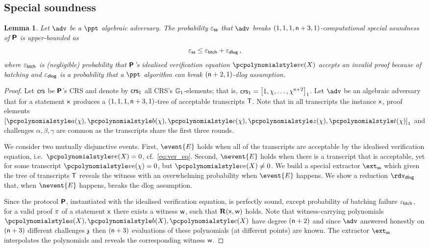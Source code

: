 \let\accentvec\vec \documentclass[runningheads,10pt]{llncs}
\newtheorem{lemma}[theorem]{Lemma}
\begin{document}
\subsection{Special soundness}
\begin{lemma}
	\label{lem:plonkprot_ss}
	Let $\adv$ be a $\ppt$ algebraic adversary. The probability $\varepsilon_{\mathsf{ss}}$ that $\adv$ breaks 
	 $(1, 1, 1, \mathsf{n} + 3, 1)$-computational special soundness of $\bm{\mathsf{P}}$ is upper-bounded as
	 \[
	 	\varepsilon_{\mathsf{ss}} \leq \varepsilon_{\mathsf{btch}} + \varepsilon_{\mathsf{dlog}}\,,
	 \] 
	 where $\varepsilon_{\mathsf{btch}}$ is (negligible) probability that $\bm{\mathsf{P}}$'s idealised verification equation $\vereq(X)$ accepts an invalid proof because of batching and $\varepsilon_{\mathsf{dlog}}$ is a probability that a $\ppt$ algorithm can break $(\mathsf{n} + 2, 1)$-dlog assumption.
\end{lemma}
\begin{proof}
	Let $\mathsf{crs}$ be $\bm{\mathsf{P}}$'s CRS and denote by $\mathsf{crs}_1$ all CRS's $\mathbb{G}_1$-elements; that is, $\mathsf{crs}_1 = \left[1, \chi, \ldots, \chi^{\mathsf{n} + 2}\right]_{1}$. 
	Let $\adv$ be an algebraic adversary that for a statement $\mathsf{x}$ produces a $(1, 1, 1, \mathsf{n} + 3, 1)$-tree of acceptable transcripts $\mathsf{T}$. %
	Note that in all transcripts the instance $\mathsf{x}$, proof elements $\gone{\p{a}(\chi), \p{b}(\chi), \p{c}(\chi), \p{z}(\chi), \p{t}(\chi)}$ and challenges $\alpha, \beta, \gamma$ are common as the transcripts share the first three rounds. 
	
	We consider two mutually disjunctive events. 
	First, $\event{E}$ holds when all of the transcripts are acceptable by the idealised verification equation, i.e.~$\vereq(X) = 0$, cf.~\cref{eq:ver_eq}.
	Second, $\nevent{E}$ holds when there is a transcript that is acceptable, yet 
	for some transcript $\vereq(\chi) = 0$, but $\vereq(X) \neq 0$.
	We build a special extractor $\extss$ which given the tree of transcripts $\mathsf{T}$ reveals the witness with an overwhelming probability when $\event{E}$ happens. 
	We show a reduction $\rdvdlog$ that, when $\nevent{E}$ happens, breaks the dlog assumption. 
	
	  Since the protocol $\bm{\mathsf{P}}$,
	instantiated with the idealised verification equation, is perfectly sound,
	except probability of batching failure $\varepsilon_{\mathsf{btch}}$, for a valid proof
	$\pi$ of a statement $\mathsf{x}$ there exists a witness $\mathsf{w}$, such that
	$\mathbf{R}(\mathsf{x}, \mathsf{w})$ holds.  Note that witness-carrying polynomials $\p{a}(X),
	\p{b}(X), \p{c}(X)$ have degree $(\mathsf{n} + 2)$ and since $\adv$
	answered honestly on $(\mathsf{n} + 3)$ different challenges $\mathfrak{z}$
	then $(\mathsf{n} + 3)$ evaluations of these polynomials (at
	different points) are known. The extractor $\extss$ interpolates the
	polynomials and reveals the corresponding witness $\mathsf{w}$. 
	

\end{proof}
\end{document}
